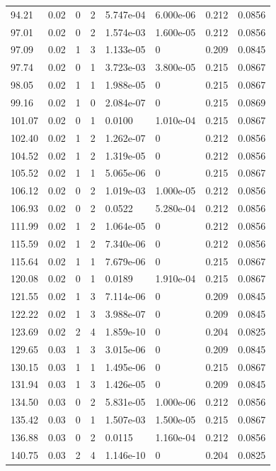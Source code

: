\documentclass[preview]{standalone}
\begin{document}
{{{\begin{tabular}{L{1.2cm}C{1.2cm} C{0.3cm}C{0.5cm} C{1.4cm}C{1.4cm} C{1.4cm}C{1.4cm}}
  94.21  &  0.02  & 0     &  2 &  5.747e-04  & 6.000e-06  & 0.212 &  0.0856   \\ 
  97.01  &  0.02  & 0     &  2 &  1.574e-03  & 1.600e-05  & 0.212 &  0.0856   \\ 
  97.09  &  0.02  & 1     &  3 &  1.133e-05  & 0  & 0.209 &  0.0845   \\ 
  97.74  &  0.02  & 0     &  1 &  3.723e-03  & 3.800e-05  & 0.215 &  0.0867   \\ 
  98.05  &  0.02  & 1     &  1 &  1.988e-05  & 0  & 0.215 &  0.0867   \\ 
  99.16  &  0.02  & 1     &  0 &  2.084e-07  & 0  & 0.215 &  0.0869   \\ 
  101.07  &  0.02  & 0     &  1 &  0.0100  & 1.010e-04  & 0.215 &  0.0867   \\ 
  102.40  &  0.02  & 1     &  2 &  1.262e-07  & 0  & 0.212 &  0.0856   \\ 
  104.52  &  0.02  & 1     &  2 &  1.319e-05  & 0  & 0.212 &  0.0856   \\ 
  105.52  &  0.02  & 1     &  1 &  5.065e-06  & 0  & 0.215 &  0.0867   \\ 
  106.12  &  0.02  & 0     &  2 &  1.019e-03  & 1.000e-05  & 0.212 &  0.0856   \\ 
  106.93  &  0.02  & 0     &  2 &  0.0522  & 5.280e-04  & 0.212 &  0.0856   \\ 
  111.99  &  0.02  & 1     &  2 &  1.064e-05  & 0  & 0.212 &  0.0856   \\ 
  115.59  &  0.02  & 1     &  2 &  7.340e-06  & 0  & 0.212 &  0.0856   \\ 
  115.64  &  0.02  & 1     &  1 &  7.679e-06  & 0  & 0.215 &  0.0867   \\ 
  120.08  &  0.02  & 0     &  1 &  0.0189  & 1.910e-04  & 0.215 &  0.0867   \\ 
  121.55  &  0.02  & 1     &  3 &  7.114e-06  & 0  & 0.209 &  0.0845   \\ 
  122.22  &  0.02  & 1     &  3 &  3.988e-07  & 0  & 0.209 &  0.0845   \\ 
  123.69  &  0.02  & 2     &  4 &  1.859e-10  & 0  & 0.204 &  0.0825   \\ 
  129.65  &  0.03  & 1     &  3 &  3.015e-06  & 0  & 0.209 &  0.0845   \\ 
  130.15  &  0.03  & 1     &  1 &  1.495e-06  & 0  & 0.215 &  0.0867   \\ 
  131.94  &  0.03  & 1     &  3 &  1.426e-05  & 0  & 0.209 &  0.0845   \\ 
  134.50  &  0.03  & 0     &  2 &  5.831e-05  & 1.000e-06  & 0.212 &  0.0856   \\ 
  135.42  &  0.03  & 0     &  1 &  1.507e-03  & 1.500e-05  & 0.215 &  0.0867   \\ 
  136.88  &  0.03  & 0     &  2 &  0.0115  & 1.160e-04  & 0.212 &  0.0856   \\ 
  140.75  &  0.03  & 2     &  4 &  1.146e-10  & 0  & 0.204 &  0.0825   \\ 
\hline 
\end{tabular} 

}}}
\end{document}
